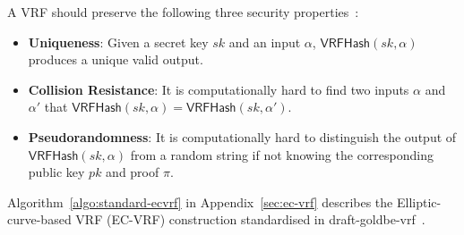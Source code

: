 A VRF should preserve the following three security properties~\cite{goldberg2017draft}:

\begin{itemize}
    \item \textbf{Uniqueness}: Given a secret key $sk$ and an input $\alpha$, $\mathsf{VRFHash}(sk, \alpha)$ produces a unique valid output.
    \item \textbf{Collision Resistance}: It is computationally hard to find two inputs $\alpha$ and $\alpha'$ that $\mathsf{VRFHash}(sk, \alpha) = \mathsf{VRFHash}(sk, \alpha')$.
    \item \textbf{Pseudorandomness}: It is computationally hard to distinguish the output of $\mathsf{VRFHash}(sk, \alpha)$ from a random string if not knowing the corresponding public key $pk$ and proof $\pi$.
\end{itemize}

Algorithm~\ref{algo:standard-ecvrf} in Appendix~\ref{sec:ec-vrf} describes the Elliptic-curve-based VRF (EC-VRF) construction standardised in draft-goldbe-vrf~\cite{goldberg2017draft}.

